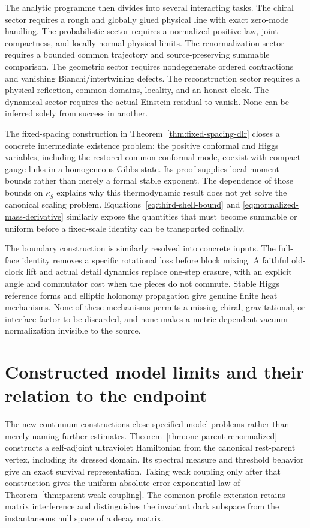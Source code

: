 \documentclass[11pt,a4paper,oneside]{book}
\theoremstyle{plain}
\theoremstyle{definition}
\theoremstyle{remark}
\begin{document}
The analytic programme then divides into several interacting tasks. The chiral sector requires a rough and globally glued physical line with exact zero-mode handling. The probabilistic sector requires a normalized positive law, joint compactness, and locally normal physical limits. The renormalization sector requires a bounded common trajectory and source-preserving summable comparison. The geometric sector requires nondegenerate ordered contractions and vanishing Bianchi/intertwining defects. The reconstruction sector requires a physical reflection, common domains, locality, and an honest clock. The dynamical sector requires the actual Einstein residual to vanish. None can be inferred solely from success in another.

The fixed-spacing construction in
Theorem~\ref{thm:fixed-spacing-dlr} closes a concrete intermediate existence
problem: the positive conformal and Higgs variables, including the restored
common conformal mode, coexist with compact gauge links in a homogeneous
Gibbs state.  Its proof supplies local moment bounds rather than merely a
formal stable exponent.  The dependence of those bounds on $\kappa_g$
explains why this thermodynamic result does not yet solve the canonical
scaling problem.  Equations~\eqref{eq:third-shell-bound} and
\eqref{eq:normalized-mass-derivative} similarly expose the quantities that
must become summable or uniform before a fixed-scale identity can be
transported cofinally.

The boundary construction is similarly resolved into concrete inputs.
The full-face identity removes a specific rotational loss before block
mixing.  A faithful old-clock lift and actual detail dynamics replace
one-step erasure, with an explicit angle and commutator cost when the
pieces do not commute.  Stable Higgs reference forms and elliptic
holonomy propagation give genuine finite heat mechanisms.  None of
these mechanisms permits a missing chiral, gravitational, or interface
factor to be discarded, and none makes a metric-dependent vacuum
normalization invisible to the source.

\section{Constructed model limits and their relation to the endpoint}
The new continuum constructions close specified model problems rather
than merely naming further estimates.  Theorem~\ref{thm:one-parent-renormalized}
constructs a self-adjoint ultraviolet Hamiltonian from the canonical
rest-parent vertex, including its dressed domain.  Its spectral measure
and threshold behavior give an exact survival representation.  Taking
weak coupling only after that construction gives the uniform
absolute-error exponential law of
Theorem~\ref{thm:parent-weak-coupling}.  The common-profile extension
retains matrix interference and distinguishes the invariant dark
subspace from the instantaneous null space of a decay matrix.
\end{document}

